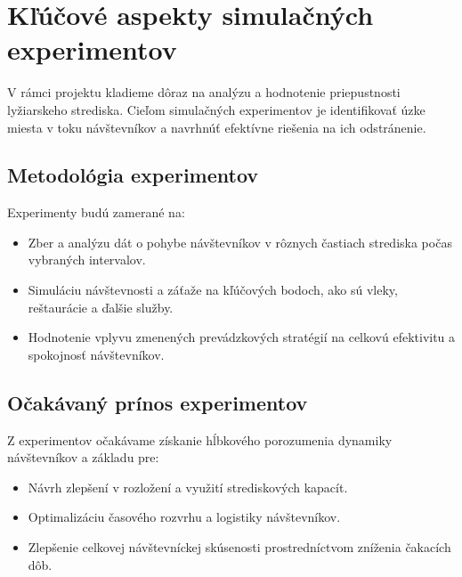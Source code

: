 ﻿\section{Kľúčové aspekty simulačných experimentov}

V rámci projektu kladieme dôraz na analýzu a hodnotenie priepustnosti lyžiarskeho strediska. Cieľom simulačných experimentov je 
identifikovať úzke miesta v toku návštevníkov a navrhnúť efektívne riešenia na ich odstránenie.

\subsection{Metodológia experimentov}

Experimenty budú zamerané na:
\begin{itemize}
  \item Zber a analýzu dát o pohybe návštevníkov v rôznych častiach strediska počas vybraných intervalov.
  \item Simuláciu návštevnosti a záťaže na kľúčových bodoch, ako sú vleky, reštaurácie a ďalšie služby.
  \item Hodnotenie vplyvu zmenených prevádzkových stratégií na celkovú efektivitu a spokojnosť návštevníkov.
\end{itemize}

\subsection{Očakávaný prínos experimentov}

Z experimentov očakávame získanie hĺbkového porozumenia dynamiky návštevníkov a základu pre:
\begin{itemize}
  \item Návrh zlepšení v rozložení a využití strediskových kapacít.
  \item Optimalizáciu časového rozvrhu a logistiky návštevníkov.
  \item Zlepšenie celkovej návštevníckej skúsenosti prostredníctvom zníženia čakacích dôb.
\end{itemize}

